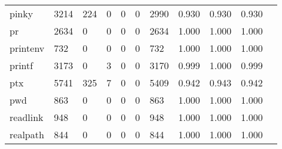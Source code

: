 \begin{longtable}{lp{1.10cm}p{1.10cm}p{1.10cm}p{1.10cm}p{1.10cm}p{1.10cm}p{1.10cm}p{1.10cm}p{1.10cm}p{1.10cm}}
pinky     &                   3214 &                                224 &                                 0 &                                0 &                                 0 &                            2990 &                          0.930 &                                 0.930 &                               0.930 \\
pr        &                   2634 &                                  0 &                                 0 &                                0 &                                 0 &                            2634 &                          1.000 &                                 1.000 &                               1.000 \\
printenv  &                    732 &                                  0 &                                 0 &                                0 &                                 0 &                             732 &                          1.000 &                                 1.000 &                               1.000 \\
printf    &                   3173 &                                  0 &                                 3 &                                0 &                                 0 &                            3170 &                          0.999 &                                 1.000 &                               0.999 \\
ptx       &                   5741 &                                325 &                                 7 &                                0 &                                 0 &                            5409 &                          0.942 &                                 0.943 &                               0.942 \\
pwd       &                    863 &                                  0 &                                 0 &                                0 &                                 0 &                             863 &                          1.000 &                                 1.000 &                               1.000 \\
readlink  &                    948 &                                  0 &                                 0 &                                0 &                                 0 &                             948 &                          1.000 &                                 1.000 &                               1.000 \\
realpath  &                    844 &                                  0 &                                 0 &                                0 &                                 0 &                             844 &                          1.000 &                                 1.000 &                               1.000 \\

\end{longtable}
